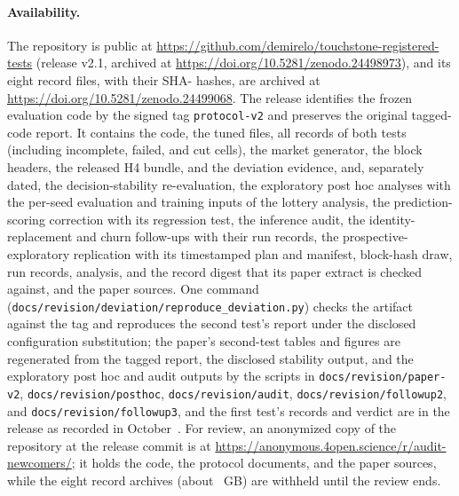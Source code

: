 \documentclass[11pt]{article}
\begin{document}
\paragraph{Availability.} The repository is public at \url{https://github.com/demirelo/touchstone-registered-tests} (release v2.1, archived at \url{https://doi.org/10.5281/zenodo.24498973}), and its eight record files, with their SHA- hashes, are archived at \url{https://doi.org/10.5281/zenodo.24499068}. The release identifies the frozen evaluation code by the signed tag \texttt{protocol-v2} and preserves the original tagged-code report. It contains the code, the tuned files, all records of both tests (including incomplete, failed, and cut cells), the market generator, the block headers, the released H4 bundle, and the deviation evidence, and, separately dated, the decision-stability re-evaluation, the exploratory post hoc analyses with the per-seed evaluation and training inputs of the lottery analysis, the prediction-scoring correction with its regression test, the inference audit, the identity-replacement and churn follow-ups with their run records, the prospective-exploratory replication with its timestamped plan and manifest, block-hash draw, run records, analysis, and the record digest that its paper extract is checked against, and the paper sources. One command (\texttt{docs/revision/deviation/reproduce\_deviation.py}) checks the artifact against the tag and reproduces the second test's report under the disclosed configuration substitution; the paper's second-test tables and figures are regenerated from the tagged report, the disclosed stability output, and the exploratory post hoc and audit outputs by the scripts in \texttt{docs/revision/paper-v2}, \texttt{docs/revision/posthoc}, \texttt{docs/revision/audit}, \texttt{docs/revision/followup2}, and \texttt{docs/revision/followup3}, and the first test's records and verdict are in the release as recorded in October~. For review, an anonymized copy of the repository at the release commit is at \url{https://anonymous.4open.science/r/audit-newcomers/}; it holds the code, the protocol documents, and the paper sources, while the eight record archives (about ~GB) are withheld until the review ends.
\end{document}

